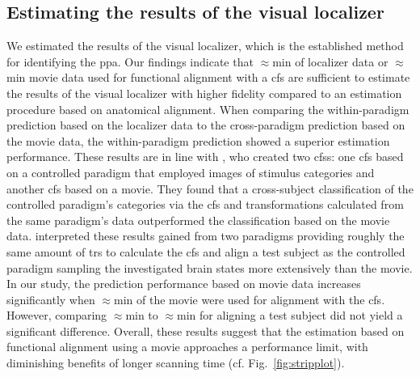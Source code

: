 \pagebreak


\subsection{Estimating the results of the visual localizer}

We estimated the results of the visual localizer, which is the established
method for identifying the \ac{ppa}.
%
Our findings indicate that $\approx$\unit[15]{min} of localizer data or
$\approx$\unit[15]{min} movie data used for functional alignment with a \ac{cfs}
are sufficient to estimate the results of the visual localizer with higher
fidelity compared to an estimation procedure based on anatomical alignment.
%
When comparing the within-paradigm prediction based on the localizer data to the
cross-paradigm prediction based on the movie data, the within-paradigm
prediction showed a superior estimation performance.
%
These results are in line with \citet{haxby2011common}, who created two
\acp{cfs}:
%
one \ac{cfs} based on a controlled paradigm that employed images of stimulus
categories and another \ac{cfs} based on a movie.
%
They found that a cross-subject classification of the controlled paradigm's
categories via the \ac{cfs} and transformations calculated from the same
paradigm's data outperformed the classification based on the movie data.
%
\citet{haxby2011common} interpreted these results gained from two paradigms
providing roughly the same amount of \acp{tr} to calculate the \ac{cfs} and
align a test subject as the controlled paradigm sampling the investigated brain
states more extensively than the movie.
%
In our study, the prediction performance based on movie data increases
significantly when $\approx$\unit[30]{min} of the movie were used for alignment
with the \ac{cfs}.
%
However, comparing $\approx$\unit[30]{min} to $\approx$\unit[45]{min} for
aligning a test subject did not yield a significant difference.
%
Overall, these results suggest that the estimation based on functional alignment
using a movie approaches a performance limit, with diminishing benefits of
longer scanning time (cf. Fig.~\ref{fig:stripplot}).





